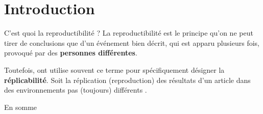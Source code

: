 \documentclass[aspectratio=169,10pt,xcolor=x11names,english,french]{beamer}
\begin{document}
	\section{Introduction}
	\begin{frame}{C'est quoi la reproductibilité ?}
		La reproductibilité est le principe qu'on ne peut tirer de conclusions que d'un événement bien décrit, qui est apparu plusieurs fois, provoqué par des \textbf{personnes différentes}.
		
		Toutefois, ont utilise souvent ce terme pour spécifiquement désigner la \textbf{réplicabilité}. Soit la réplication (reproduction) des résultats d'un article dans des environnements pas (toujours) différents \cite{replicationvsreproductiblity, pineau2020improving}.
	\end{frame}
	
	\begin{frame}{En somme}
		\centering
			\uncover<1->{\begin{minipage}{0.24\linewidth}
					\fontsize{35}{35}\selectfont\textcolor[cmyk]{0.67, 0.66, 0, 0.71}\faCopy
			\end{minipage}}
				\uncover<2->{\begin{minipage}{0.24\linewidth}
				\fontsize{35}{35}\selectfont\textcolor[cmyk]{0.67, 0.66, 0, 0.71}\faDatabase
			\end{minipage}}
				\uncover<3->{\begin{minipage}{0.24\linewidth}
				\fontsize{35}{35}\selectfont\textcolor[cmyk]{0.67, 0.66, 0, 0.71}\faCogs
			\end{minipage}}
				\uncover<4->{\begin{minipage}{0.24\linewidth}
				\fontsize{35}{35}\selectfont\textcolor[cmyk]{0.67, 0.66, 0, 0.71}\faCode
			\end{minipage}}
	\end{frame}
	
\end{document}
